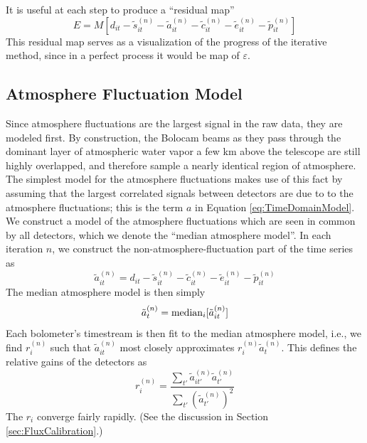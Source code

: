 \documentclass[12pt,preprint]{aastex}
\newcommand{\ie}{{i.e.\/}}
\newcommand{\epsi}{\varepsilon}
\begin{document}
It is useful at each step to produce a ``residual map''
\begin{equation}
\label{eq:ResidualMap}
E = M[d_{it} - \tilde{s}^{(n)}_{it} - \tilde{a}^{(n)}_{it} 
- \tilde{c}^{(n)}_{it}
- \tilde{e}^{(n)}_{it}
- \tilde{p}^{(n)}_{it} ]
\end{equation}
This residual map serves as a visualization of the progress of the
iterative method, since in a perfect process it would be map of
$\epsi$.  

\subsection{Atmosphere Fluctuation Model}
\label{sec:AtmosphereModel}

Since atmosphere fluctuations are the largest signal in the raw data,
they are modeled first.  By construction, the Bolocam beams as they
pass through the dominant layer of atmospheric water vapor a few km
above the telescope are still highly overlapped, and therefore sample
a nearly identical region of atmosphere.  The simplest model for the
atmosphere fluctuations makes use of this fact by assuming that the
largest correlated signals between detectors are due to to the
atmosphere fluctuations; this is the term $a$ in Equation
\ref{eq:TimeDomainModel}.  We construct a model of the atmosphere
fluctuations which are seen in common by all detectors, which we
denote the ``median atmosphere model''.  In each iteration $n$, we
construct the non-atmosphere-fluctuation part of the time series as
\begin{equation}
\tilde{a}^{(n)}_{it} = 
d_{it} - \tilde{s}^{(n)}_{it} - 
\tilde{c}^{(n)}_{it} - \tilde{e}^{(n)}_{it} - \tilde{p}^{(n)}_{it}
\end{equation}
The median atmosphere model is then simply
\begin{equation}
\label{eq:MeanAtmosphereModel}
\tilde{a}^{(n)}_t = 
{\rm median}_i[{\tilde{a}^{(n)}_{it}}]
\end{equation}
Each bolometer's timestream is then fit to the median atmosphere model,
\ie, we find $r_i^{(n)}$ such that $\tilde{a}^{(n)}_{it}$ most closely
approximates $r_i^{(n)} \tilde{a}^{(n)}_t$.  This defines the
relative gains of the detectors as
\begin{equation}
\label{eq:RelativeGains}
r_i^{(n)} = \frac{\sum_{t'} \tilde{a}^{(n)}_{it'} \tilde{a}^{(n)}_{t'}}
{\sum_{t'} (\tilde{a}^{(n)}_{t'})^2}
\end{equation}
The $r_i$ converge fairly rapidly.  (See the discussion in Section
\ref{sec:FluxCalibration}.)  
\end{document}
